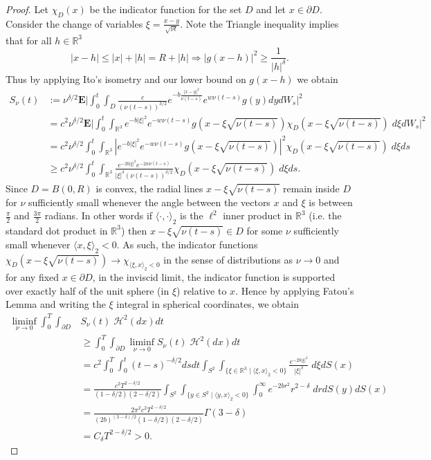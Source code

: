 \documentclass[11pt, reqno]{article}
\def\R{{\mathbb R}} %
\def\E{\mathbf{E}}
\def\H{{\mathcal H}}
\begin{document}
\begin{proof}
    Let $\chi_D(x)$ be the indicator function for the set $D$ and let $x \in \partial D$. Consider the change of variables $\xi = \frac{x-y}{\sqrt{\nu t}}$. Note the Triangle inequality implies that for all $h \in \R^3$
    \[
        |x-h| \leq |x| + |h| = R + |h| \Rightarrow |g(x-h)|^2 \geq \frac{1}{|h|^\delta}.
    \]
    Thus by applying Ito's isometry and our lower bound on $g(x-h)$ we obtain
    \begin{align*}
        S_\nu(t) &:= \nu^{\delta/2}\E\big|\int_0^t\int_D \frac{c}{(\nu (t-s))^{3/2}}e^{-b\frac{|x-y|^2}{\nu (t-s)}}e^{w\nu (t-s)}g(y)dydW_s\big|^2\\
        &= c^2\nu^{\delta/2} \E\big|\int_0^t\int_{\R^3} e^{-b|\xi|^2}e^{-w\nu (t-s)}g(x-\xi\sqrt{\nu (t-s)})\chi_D(x-\xi\sqrt{\nu (t-s)})\;d\xi dW_s\big|^2\\
        &=  c^2\nu^{\delta/2} \int_0^t\int_{\R^3} |e^{-b|\xi|^2}e^{-w\nu (t-s)}g(x-\xi\sqrt{\nu (t-s)})|^2\chi_D(x-\xi\sqrt{\nu (t-s)})\;d\xi ds\\
        &\geq c^2\nu^{\delta/2}\int_0^t\int_{\R^3} \frac{e^{-2b|\xi|^2}e^{-2w\nu (t-s)}}{|\xi|^\delta (\nu (t-s))^{\delta/2}}\chi_D(x-\xi\sqrt{\nu (t-s)})\;d\xi ds.
    \end{align*}
    Since $D = B(0, R)$ is convex, the radial lines $x - \xi\sqrt{\nu (t-s)}$ remain inside $D$ for $\nu$ sufficiently small whenever the angle between the vectors $x$ and $\xi$ is between $\frac{\pi}{2}$ and $\frac{3\pi}{2}$ radians. In other words if $\langle \cdot, \cdot \rangle_2$ is the $\ell^2$ inner product in $\R^3$ (i.e. the standard dot product in $\R^3$) then $x - \xi\sqrt{\nu (t-s)} \in D$ for some $\nu$ sufficiently small whenever $\langle x, \xi\rangle_2 < 0$. As such, the indicator functions $\chi_D(x - \xi\sqrt{\nu (t-s)}) \to \chi_{\langle \xi, x\rangle_2 < 0}$ in the sense of distributions as $\nu \to 0$ and for any fixed $x \in \partial D$, in the inviscid limit, the indicator function is supported over exactly half of the unit sphere (in $\xi$) relative to $x$.
    Hence by applying Fatou's Lemma and writing the $\xi$ integral in spherical coordinates, we obtain
    \begin{align*}
        \liminf_{\nu \to 0} \int_0^T\int_{\partial D} &S_\nu(t)\;\H^2(dx) dt\\
        &\geq \int_0^T\int_{\partial D} \liminf_{\nu \to 0}S_\nu(t)\;\H^2(dx)dt\\
        &= c^2 \int_0^T\int_0^t (t-s)^{-\delta/2}dsdt\int_{S^2} \int_{\{\xi \in \R^3 \mid \langle \xi, x\rangle_2 < 0\}} \frac{e^{-2b|\xi|^2}}{|\xi|^\delta}\;d\xi dS(x)\\
        &= \frac{c^2T^{2-\delta/2}}{(1-\delta/2)(2-\delta/2)}\int_{S^2}\int_{\{y \in S^2 \mid \langle y, x\rangle_2 < 0\}}\int_0^\infty e^{-2br^2}r^{2-\delta}\;drdS(y)dS(x)\\
        &= \frac{2\pi^2c^2T^{2-\delta/2}}{(2b)^{(3-\delta)/2}(1-\delta/2)(2-\delta/2)}\Gamma(3-\delta)\\
        &= C_\delta T^{2-\delta/2} > 0.
    \end{align*}
\end{proof}
\end{document}
